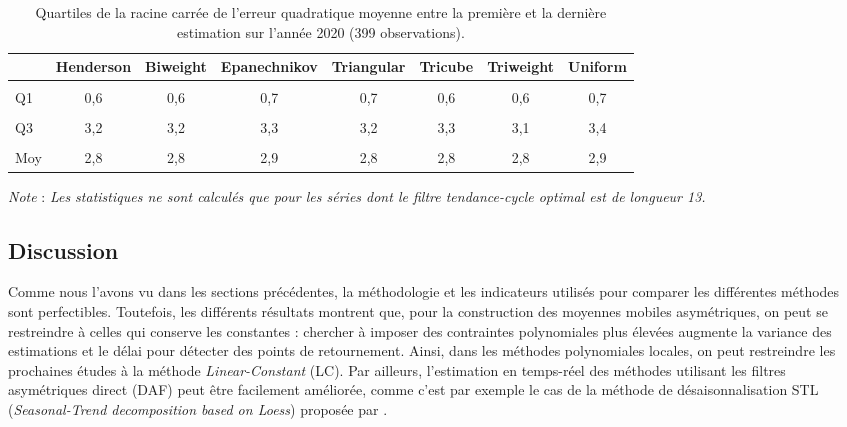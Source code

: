 \documentclass[
  11pt,
  french,
  a4paper]{article}
\newcommand\1{\mathds{1}}
\begin{document}
\begin{table}[!h]

\caption{\label{tab:covid-rev-kernels}Quartiles de la racine carrée de l'erreur quadratique moyenne entre la première et la dernière estimation sur l'année 2020 (399 observations).}
\centering
\begin{tabular}[t]{lccccccc}
\toprule
  & Henderson & Biweight & Epanechnikov & Triangular & Tricube & Triweight & Uniform\\
\midrule
\cellcolor{gray!6}{Min} & \cellcolor{gray!6}{0,1} & \cellcolor{gray!6}{0,1} & \cellcolor{gray!6}{0,1} & \cellcolor{gray!6}{0,1} & \cellcolor{gray!6}{0,1} & \cellcolor{gray!6}{0,1} & \cellcolor{gray!6}{0,1}\\
Q1 & 0,6 & 0,6 & 0,7 & 0,7 & 0,6 & 0,6 & 0,7\\
\cellcolor{gray!6}{Méd.} & \cellcolor{gray!6}{1,5} & \cellcolor{gray!6}{1,5} & \cellcolor{gray!6}{1,6} & \cellcolor{gray!6}{1,5} & \cellcolor{gray!6}{1,5} & \cellcolor{gray!6}{1,5} & \cellcolor{gray!6}{1,5}\\
Q3 & 3,2 & 3,2 & 3,3 & 3,2 & 3,3 & 3,1 & 3,4\\
\cellcolor{gray!6}{Max} & \cellcolor{gray!6}{41,0} & \cellcolor{gray!6}{41,1} & \cellcolor{gray!6}{39,4} & \cellcolor{gray!6}{40,3} & \cellcolor{gray!6}{41,3} & \cellcolor{gray!6}{39,5} & \cellcolor{gray!6}{39,7}\\
\addlinespace
Moy & 2,8 & 2,8 & 2,9 & 2,8 & 2,8 & 2,8 & 2,9\\
\bottomrule
\end{tabular}
\footnotesize


\emph{Note} : \emph{Les statistiques ne sont calculés que pour les séries dont le filtre tendance-cycle optimal est de longueur 13.}
\normalsize\end{table}

\hypertarget{discussion}{%
\subsection{Discussion}\label{discussion}}

Comme nous l'avons vu dans les sections précédentes, la méthodologie et les indicateurs utilisés pour comparer les différentes méthodes sont perfectibles.
Toutefois, les différents résultats montrent que, pour la construction des moyennes mobiles asymétriques, on peut se restreindre à celles qui conserve les constantes : chercher à imposer des contraintes polynomiales plus élevées augmente la variance des estimations et le délai pour détecter des points de retournement.
Ainsi, dans les méthodes polynomiales locales, on peut restreindre les prochaines études à la méthode \emph{Linear-Constant} (LC).
Par ailleurs, l'estimation en temps-réel des méthodes utilisant les filtres asymétriques direct (DAF) peut être facilement améliorée, comme c'est par exemple le cas de la méthode de désaisonnalisation STL (\emph{Seasonal-Trend decomposition based on Loess}) proposée par \textcite{cleveland90}.
\end{document}

